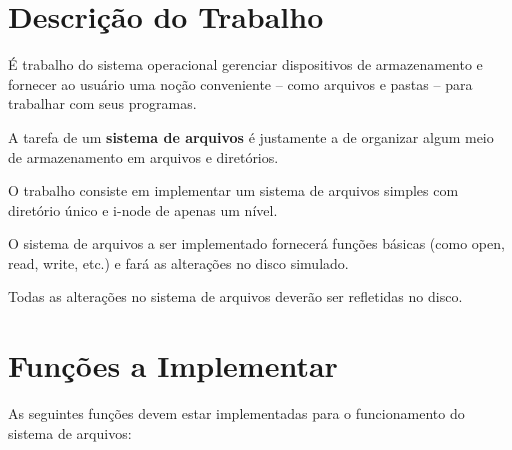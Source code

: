 \documentclass[a4paper, oneside,12pt]{article}
\begin{document}
\finishgrading    %

\section{Descrição do Trabalho} \label{sec:desc_prob}

É trabalho do sistema operacional gerenciar dispositivos de armazenamento e fornecer ao usuário uma noção conveniente -- como arquivos e pastas -- para trabalhar com seus programas.

A tarefa de um \textbf{sistema de arquivos} é justamente a de organizar algum meio de armazenamento em arquivos e diretórios.

O trabalho consiste em implementar um sistema de arquivos simples com diretório único e i-node de apenas um nível.


O sistema de arquivos a ser implementado fornecerá funções básicas (como open, read, write, etc.) e fará as alterações no disco simulado.

Todas as alterações no sistema de arquivos deverão ser refletidas no disco.


\section{Funções a Implementar}

As seguintes funções devem estar implementadas para o funcionamento do sistema de arquivos:
\end{document}
